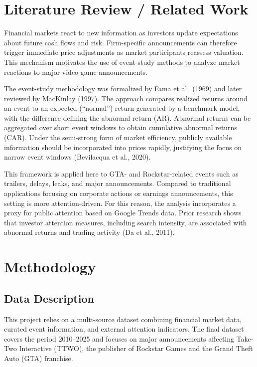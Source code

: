 \documentclass[11pt,a4paper]{article}
\begin{document}
\section{Literature Review / Related Work}
\label{sec:literature}

Financial markets react to new information as investors update expectations about future cash flows and risk. Firm-specific announcements can therefore trigger immediate price adjustments as market participants reassess valuation. This mechanism motivates the use of event-study methods to analyze market reactions to major video-game announcements.

The event-study methodology was formalized by Fama et al.\ (1969) and later reviewed by MacKinlay (1997). The approach compares realized returns around an event to an expected (“normal”) return generated by a benchmark model, with the difference defining the abnormal return (AR). Abnormal returns can be aggregated over short event windows to obtain cumulative abnormal returns (CAR). Under the semi-strong form of market efficiency, publicly available information should be incorporated into prices rapidly, justifying the focus on narrow event windows (Bevilacqua et al., 2020).

This framework is applied here to GTA- and Rockstar-related events such as trailers, delays, leaks, and major announcements. Compared to traditional applications focusing on corporate actions or earnings announcements, this setting is more attention-driven. For this reason, the analysis incorporates a proxy for public attention based on Google Trends data. Prior research shows that investor attention measures, including search intensity, are associated with abnormal returns and trading activity (Da et al., 2011).

\section{Methodology}
\label{sec:methodology}

\subsection{Data Description}

This project relies on a multi-source dataset combining financial market data, curated event information, and external attention indicators. The final dataset covers the period 2010--2025 and focuses on major announcements affecting Take-Two Interactive (TTWO), the publisher of Rockstar Games and the Grand Theft Auto (GTA) franchise.
\end{document}
